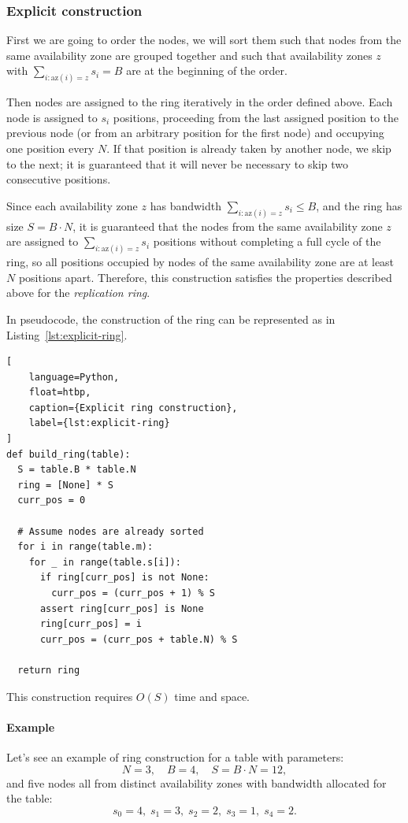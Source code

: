 \subsubsection{Explicit construction}
\label{subsubsec:explicit-construction}

First we are going to order the nodes, we will sort them such that nodes from
the same availability zone are grouped together and such that availability
zones $z$ with $\sum_{i : \mathrm{az}(i) = z} s_i = B$ are at the beginning of
the order.

Then nodes are assigned to the ring iteratively in the order defined above.
Each node is assigned to $s_i$ positions, proceeding from the last assigned
position to the previous node (or from an arbitrary position for the first
node) and occupying one position every $N$.
If that position is already taken by another node, we skip to the next; it is
guaranteed that it will never be necessary to skip two consecutive positions.

Since each availability zone $z$ has bandwidth $\sum_{i : \mathrm{az}(i) = z}
s_i \leq B$, and the ring has size $S = B \cdot N$, it is guaranteed that the
nodes from the same availability zone $z$ are assigned to $\sum_{i :
\mathrm{az}(i) = z} s_i$ positions without completing a full cycle of the ring,
so all positions occupied by nodes of the same availability zone are at least
$N$ positions apart.
Therefore, this construction satisfies the properties described above for the
\emph{replication ring}.

\noindent In pseudocode, the construction of the ring can be represented as in Listing~\ref{lst:explicit-ring}.

\begin{lstlisting}[
    language=Python,
    float=htbp,
    caption={Explicit ring construction},
    label={lst:explicit-ring}
]
def build_ring(table):
  S = table.B * table.N
  ring = [None] * S
  curr_pos = 0

  # Assume nodes are already sorted
  for i in range(table.m):
    for _ in range(table.s[i]):
      if ring[curr_pos] is not None:
        curr_pos = (curr_pos + 1) % S
      assert ring[curr_pos] is None
      ring[curr_pos] = i
      curr_pos = (curr_pos + table.N) % S

  return ring
\end{lstlisting}

This construction requires $O(S)$ time and space.

\paragraph{Example}
Let's see an example of ring construction for a table with parameters:
\[
    N = 3,\quad
    B = 4,\quad
    S = B \cdot N = 12,
\]
and five nodes all from distinct availability zones with bandwidth allocated
for the table:
\[
    s_0 = 4,\; s_1 = 3,\; s_2 = 2,\; s_3 = 1,\; s_4 = 2.
\]

